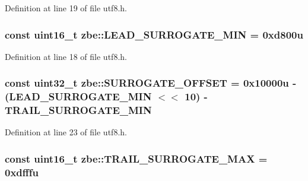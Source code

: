 Definition at line 19 of file utf8.\+h.

\hypertarget{namespacezbe_ade15aa1a63520ce8b98ea85ea838453e}{}
\subsubsection[{L\+E\+A\+D\+\_\+\+S\+U\+R\+R\+O\+G\+A\+T\+E\+\_\+\+M\+I\+N}]{\setlength{\rightskip}{0pt plus 5cm}const uint16\+\_\+t zbe\+::\+L\+E\+A\+D\+\_\+\+S\+U\+R\+R\+O\+G\+A\+T\+E\+\_\+\+M\+I\+N = 0xd800u}\label{namespacezbe_ade15aa1a63520ce8b98ea85ea838453e}


Definition at line 18 of file utf8.\+h.

\hypertarget{namespacezbe_a84ab9fa319a6700376e4c409444c3b2b}{}
\subsubsection[{S\+U\+R\+R\+O\+G\+A\+T\+E\+\_\+\+O\+F\+F\+S\+E\+T}]{\setlength{\rightskip}{0pt plus 5cm}const uint32\+\_\+t zbe\+::\+S\+U\+R\+R\+O\+G\+A\+T\+E\+\_\+\+O\+F\+F\+S\+E\+T = 0x10000u -\/ (\+L\+E\+A\+D\+\_\+\+S\+U\+R\+R\+O\+G\+A\+T\+E\+\_\+\+M\+I\+N $<$$<$ 10) -\/ T\+R\+A\+I\+L\+\_\+\+S\+U\+R\+R\+O\+G\+A\+T\+E\+\_\+\+M\+I\+N}\label{namespacezbe_a84ab9fa319a6700376e4c409444c3b2b}


Definition at line 23 of file utf8.\+h.

\hypertarget{namespacezbe_a046d90a4a14bcf0b439a6be2082ddd3b}{}
\subsubsection[{T\+R\+A\+I\+L\+\_\+\+S\+U\+R\+R\+O\+G\+A\+T\+E\+\_\+\+M\+A\+X}]{\setlength{\rightskip}{0pt plus 5cm}const uint16\+\_\+t zbe\+::\+T\+R\+A\+I\+L\+\_\+\+S\+U\+R\+R\+O\+G\+A\+T\+E\+\_\+\+M\+A\+X = 0xdfffu}\label{namespacezbe_a046d90a4a14bcf0b439a6be2082ddd3b}


